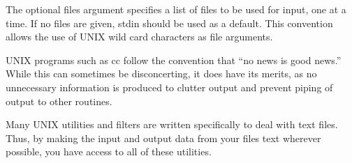      The optional  {\ms files\/} argument  specifies a  list of  
files to be used for input, one  at a  time. If  no files  are
given,  {\fn stdin} should  be used  as  a default. This  convention
allows  the use  of UNIX  wild  card characters  as  file arguments.

     UNIX programs  such as  {\cmd cc} follow  the convention  that
``no news is good news.''  While this can sometimes be disconcerting, 
it does have  its merits,  as  no unnecessary  information  is
produced to clutter output and prevent piping of output to other
routines.

     Many UNIX  utilities and  filters are  written specifically  to
deal with text files.  Thus, by  making the  input and  output data
from your files text wherever possible, you have access to all of
these utilities.

